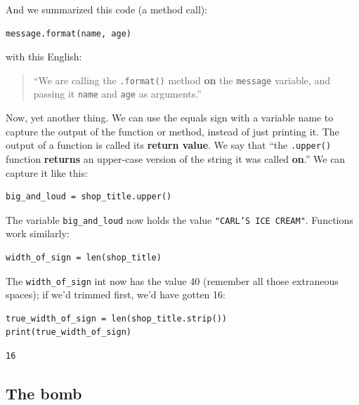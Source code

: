 And we summarized this code (a method call):

\begin{Verbatim}[fontsize=\small,samepage=true,frame=single,framesep=3mm]
message.format(name, age)
\end{Verbatim}

with this English:

\begin{quote}
``We are calling the \texttt{.format()} method \textbf{on} the \texttt{message}
variable, and passing it \texttt{name} and \texttt{age} as arguments.''
\end{quote}

Now, yet another thing. We can use the equals sign with a variable name to
capture the output of the function or method, instead of just printing it. The
output of a function is called its \textbf{return value}. We say that ``the
\texttt{.upper()} function \textbf{returns} an upper-case version of the string
it was called \textbf{on}.'' We can capture it like this:

\begin{Verbatim}[fontsize=\small,samepage=true,frame=single,framesep=3mm]
big_and_loud = shop_title.upper()
\end{Verbatim}

The variable \texttt{big\_and\_loud} now holds the value \texttt{"CARL'S ICE
CREAM"}. Functions work similarly:

\begin{Verbatim}[fontsize=\small,samepage=true,frame=single,framesep=3mm]
width_of_sign = len(shop_title)
\end{Verbatim}

The \texttt{width\_of\_sign} int now has the value 40 (remember all those
extraneous spaces); if we'd trimmed first, we'd have gotten 16:

\begin{Verbatim}[fontsize=\small,samepage=true,frame=single,framesep=3mm]
true_width_of_sign = len(shop_title.strip())
print(true_width_of_sign)
\end{Verbatim}

\begin{Verbatim}[fontsize=\small,samepage=true,frame=leftline,framesep=5mm,framerule=1mm]
16
\end{Verbatim}


\subsection{The bomb}

